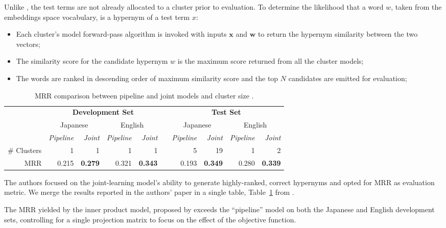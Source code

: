 Unlike \citeauthor{Fu2014, espinosa2016supervised}, the test terms are not already allocated to a cluster prior to evaluation.  To determine the likelihood that a word $w$, taken from the embeddings space vocabulary, is a hypernym of a test term $x$:
\begin{itemize}
    \item Each cluster’s model forward-pass algorithm is invoked with inputs $\bm{x}$ and $\bm{w}$ to return the hypernym similarity between the two vectors;
    \item The similarity score for the candidate hypernym $w$ is the maximum score returned from all the cluster models;
    \item The words are ranked in descending order of maximum similarity score and the top $N$ candidates are emitted for evaluation;
\end{itemize}

\begin{table}\centering
    \begin{tabular}{@{}rrrrrcrrrr@{}} \toprule
    & \multicolumn{4}{c}{\textbf{Development Set}} & \phantom{a} & \multicolumn{4}{c}{\textbf{Test Set}} \\ 
    & \multicolumn{2}{c}{Japanese} & \multicolumn{2}{c}{English} && \multicolumn{2}{c}{Japanese} & \multicolumn{2}{c}{English} \\ 
    \cmidrule{2-5} \cmidrule{7-10}
    & \textit{Pipeline} & \textit{Joint} & \textit{Pipeline} & \textit{Joint} && \textit{Pipeline} & \textit{Joint} & \textit{Pipeline} & \textit{Joint} \\ \midrule
    \# Clusters & 1 & 1 & 1 & 1 && 5 & 19 & 1 & 2 \\
    \ac{MRR} & 0.215 & \textbf{0.279} & 0.321 & \textbf{0.343} && 0.193 & \textbf{0.349} & 0.280 & \textbf{0.339} \\
    \bottomrule
    \end{tabular}
    \caption{\ac{MRR} comparison between pipeline and joint models and cluster size \citep{yamane2016distributional}.}\label{tab:yamane_results}
\end{table}

The authors focused on the joint-learning model’s ability to generate highly-ranked, correct hypernyms and opted for \ac{MRR} as evaluation metric.  We merge the results reported in the authors' paper in a single table, Table~\ref{tab:yamane_results} from \citet{yamane2016distributional}.

The \ac{MRR} yielded by the inner product model, proposed by \citep{yamane2016distributional} exceeds the “pipeline” model \citep{Fu2014} on both the Japanese and English development sets, controlling for a single projection matrix to focus on the effect of the objective function.  

